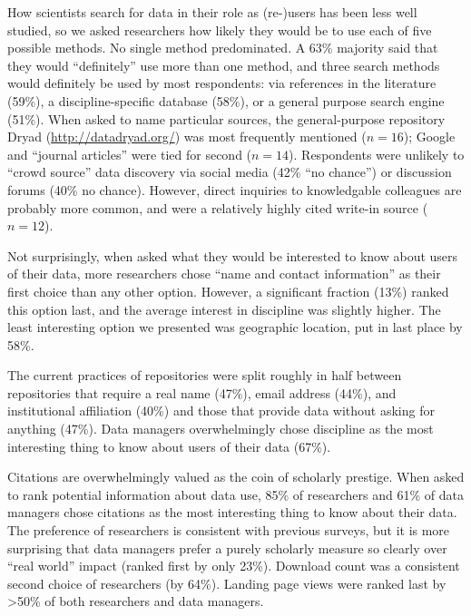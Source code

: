 \documentclass[english]{article}
\begin{document}
How scientists search for data in their role as (re-)users has been less well studied, so we asked researchers how likely they would be to use each of five possible methods.
No single method predominated.
A 63\% majority said that they would ``definitely'' use more than one method, and three search methods would definitely be used by most respondents: via references in the literature (59\%), a discipline-specific database (58\%), or a general purpose search engine (51\%). 
When asked to name particular sources, the general-purpose repository Dryad (\url{http://datadryad.org/}) was most frequently mentioned ($n=16$); Google and ``journal articles'' were tied for second ($n=14$). 
Respondents were unlikely to ``crowd source'' data discovery via social media (42\% ``no chance'') or discussion forums (40\% no chance).
However, direct inquiries to knowledgable colleagues are probably more common, and were a relatively highly cited write-in source ($n=12$).


Not surprisingly, when asked what they would be interested to know about users of their data, more researchers chose ``name and contact information'' as their first choice than any other option.
However, a significant fraction (13\%) ranked this option last, and the average interest in discipline was slightly higher.
The least interesting option we presented was geographic location, put in last place by 58\%.

The current practices of repositories were split roughly in half between repositories that require a real name (47\%), email address (44\%), and institutional affiliation (40\%) and those that provide data without asking for anything (47\%).
Data managers overwhelmingly chose discipline as the most interesting thing to know about users of their data (67\%).


Citations are overwhelmingly valued as the coin of scholarly prestige. 
When asked to rank potential information about data use, 85\% of researchers and 61\% of data managers chose citations as the most interesting thing to know about their data. 
The preference of researchers is consistent with previous surveys\cite{@kratz_researcher_2015}, but it is more surprising that data managers prefer a purely scholarly measure so clearly over ``real world'' impact (ranked first by only 23\%). 
Download count was a consistent second choice of researchers (by 64\%). 
Landing page views were ranked last by >50\% of both researchers and data managers.
\end{document}
